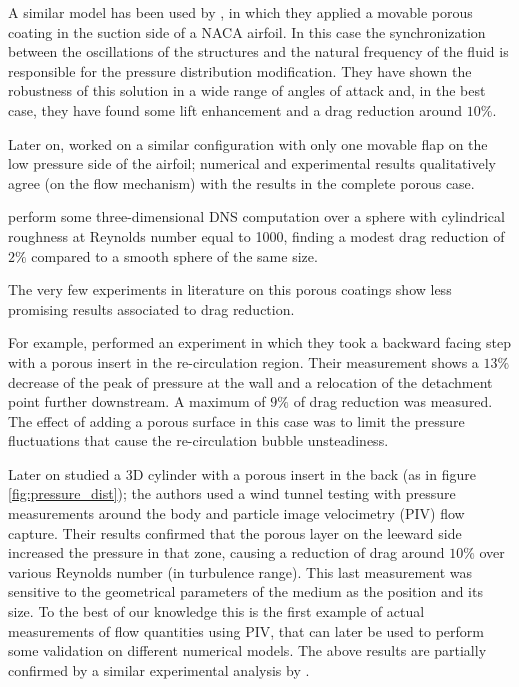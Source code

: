 A similar model has been used by \citet{venkataraman2012numerical}, in which they applied a movable porous coating in the suction side of a NACA airfoil.
In this case the synchronization between the oscillations of the structures and the natural frequency of the fluid is responsible for the pressure distribution modification.
They have shown the robustness of this solution in a wide range of angles of attack and, in the best case, they have found some lift enhancement and a drag reduction around $10\%$.

Later on, \citet{rosti2017pelskin} worked on a similar configuration with only one movable flap on the low pressure side of the airfoil; numerical and experimental results qualitatively agree (on the flow mechanism) with the results in the complete porous case.

\citet{zampogna2017new} perform some three-dimensional DNS computation over a sphere with cylindrical roughness at Reynolds number equal to 1000, finding a modest drag reduction of $2\%$ compared to a smooth sphere of the same size.

The very few experiments in literature on this porous coatings show less promising results associated to drag reduction.

For example, \citet{heenan1998passive} performed an experiment in which they took a backward facing step with a porous insert in the re-circulation region.
Their measurement shows a $13\%$ decrease of the peak of pressure at the wall and a relocation of the detachment point further downstream.
A maximum of $9\%$ of drag reduction was measured.
The effect of adding a porous surface in this case was to limit the pressure fluctuations that cause the re-circulation bubble unsteadiness.

Later on \citet{klausmann2017drag} studied a 3D cylinder with a porous insert in the back (as in figure \ref{fig:pressure_dist}); the authors used a wind tunnel testing with pressure measurements around the body and particle image velocimetry (PIV) flow capture.
Their results confirmed that the porous layer on the leeward side increased the pressure in that zone, causing a reduction of drag around $10\%$ over various Reynolds number (in turbulence range). This last measurement was sensitive to the geometrical parameters of the medium as the position and its size.
To the best of our knowledge this is the first example of actual measurements of flow quantities using PIV, that can later be used to perform some validation on different numerical models.
The above results are partially confirmed by a similar experimental analysis by \citet{grizzetti2015esperimenti}.

